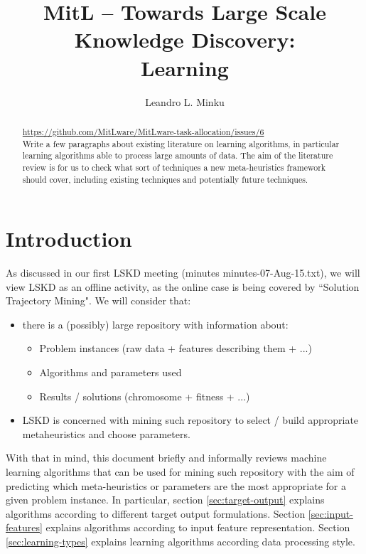 \documentclass{article}
\title{MitL -- Towards Large Scale Knowledge Discovery:\\ Learning}
\author{Leandro L. Minku}
\date{}
\begin{document}
\maketitle

\begin{abstract}
\noindent\url{https://github.com/MitLware/MitLware-task-allocation/issues/6}\\
Write a few paragraphs about existing literature on learning algorithms, in particular learning algorithms able to process large amounts of data. The aim of the literature review is for us to check what sort of techniques a new meta-heuristics framework should cover, including existing techniques and potentially future techniques.
\end{abstract}

\section{Introduction}

As discussed in our first LSKD meeting (minutes minutes-07-Aug-15.txt), we will view LSKD as an offline activity, as the online case is being covered by ``Solution Trajectory Mining". We will consider that:

\begin{itemize}
\item there is a (possibly) large repository with information about:
\begin{itemize}
\item Problem instances (raw data + features describing them + ...)
\item Algorithms and parameters used
\item Results / solutions (chromosome + fitness + ...)
\end{itemize}

\item LSKD is concerned with mining such repository to select / build appropriate metaheuristics and choose parameters.
\end{itemize}

With that in mind, this document briefly and informally reviews machine learning algorithms that can be used for mining such repository with the aim of predicting which meta-heuristics or parameters are the most appropriate for a given problem instance. In particular, section \ref{sec:target-output} explains algorithms according to different target output formulations. Section \ref{sec:input-features} explains algorithms according to input feature representation.  Section \ref{sec:learning-types} explains learning algorithms according data processing style. 
\end{document}
